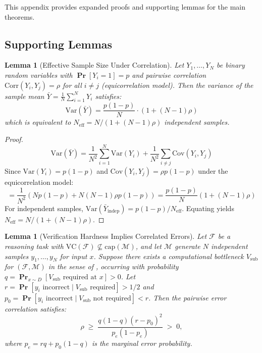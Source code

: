 \documentclass{article}
\newtheorem{lemma}[theorem]{Lemma}
\theoremstyle{definition}
\theoremstyle{remark}
\newcommand{\VC}{\mathrm{VC}}           %
\newcommand{\calM}{\mathcal{M}}         %
\newcommand{\calF}{\mathcal{F}}         %
\renewcommand{\Pr}{\operatorname{\mathbf{Pr}}}
\begin{document}
This appendix provides expanded proofs and supporting lemmas for the main theorems.

\subsection{Supporting Lemmas}

\begin{lemma}[Effective Sample Size Under Correlation]
\label{lem:effective_samples}
Let $Y_1, \ldots, Y_N$ be binary random variables with $\Pr[Y_i = 1] = p$ and pairwise correlation $\mathrm{Corr}(Y_i, Y_j) = \rho$ for all $i \neq j$ (equicorrelation model). Then the variance of the sample mean $\bar{Y} = \frac{1}{N}\sum_{i=1}^N Y_i$ satisfies:
\[
\mathrm{Var}(\bar{Y}) = \frac{p(1-p)}{N} \cdot (1 + (N-1)\rho)
\]
which is equivalent to $N_{\text{eff}} = N / (1 + (N-1)\rho)$ independent samples.
\end{lemma}

\begin{proof}
\[
\mathrm{Var}(\bar{Y}) = \frac{1}{N^2} \sum_{i=1}^N \mathrm{Var}(Y_i) + \frac{1}{N^2} \sum_{i \neq j} \mathrm{Cov}(Y_i, Y_j)
\]
Since $\mathrm{Var}(Y_i) = p(1-p)$ and $\mathrm{Cov}(Y_i, Y_j) = \rho p(1-p)$ under the equicorrelation model:
\[
= \frac{1}{N^2} \left( N p(1-p) + N(N-1) \rho p(1-p) \right) = \frac{p(1-p)}{N} (1 + (N-1)\rho)
\]
For independent samples, $\mathrm{Var}(\bar{Y}_{\text{indep}}) = p(1-p)/N_{\text{eff}}$. Equating yields $N_{\text{eff}} = N / (1 + (N-1)\rho)$.
\end{proof}

\begin{lemma}[Verification Hardness Implies Correlated Errors]
\label{lem:verification_correlation}
Let $\calF$ be a reasoning task with $\VC(\calF) \not\subseteq \mathrm{cap}(\calM)$, and let $\calM$ generate $N$ independent samples $y_1, \ldots, y_N$ for input $x$.
Suppose there exists a computational bottleneck $V_{\mathrm{sub}}$ for $(\calF, \calM)$ in the sense of , occurring with probability $q = \Pr_{x \sim D}[V_{\mathrm{sub}} \text{ required at } x] > 0$.
Let $r = \Pr[y_i \text{ incorrect} \mid V_{\mathrm{sub}} \text{ required}] > 1/2$ and $p_0 = \Pr[y_i \text{ incorrect} \mid V_{\mathrm{sub}} \text{ not required}] < r$.
Then the pairwise error correlation satisfies:
\[
\rho \;\geq\; \frac{q(1-q)(r - p_0)^2}{p_e(1-p_e)} \;>\; 0,
\]
where $p_e = rq + p_0(1-q)$ is the marginal error probability.
\end{lemma}
\end{document}
